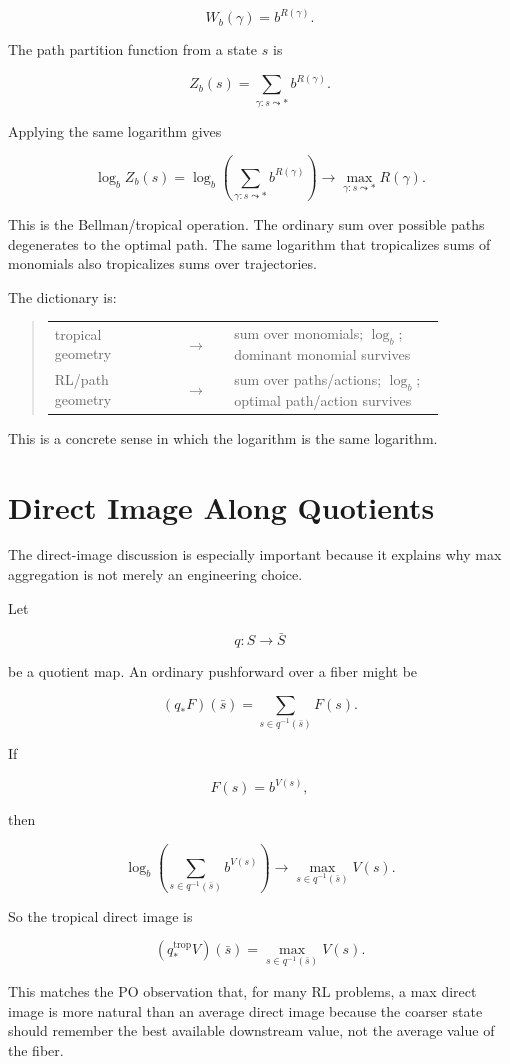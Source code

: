 \documentclass[11pt]{article}
\makeatletter
\newenvironment{dictionary}
  {\begin{quote}\begin{tabular}{@{}p{0.30\linewidth}c p{0.54\linewidth}@{}}}
  {\end{tabular}\end{quote}}
\makeatother
\begin{document}
\[
W_b(\gamma)
=
b^{R(\gamma)}.
\]

The path partition function from a state \(s\) is

\[
Z_b(s)
=
\sum_{\gamma:s\leadsto *} b^{R(\gamma)}.
\]

Applying the same logarithm gives

\[
\log_b Z_b(s)
=
\log_b
\left(
\sum_{\gamma:s\leadsto *} b^{R(\gamma)}
\right)
\longrightarrow
\max_{\gamma:s\leadsto *} R(\gamma).
\]

This is the Bellman/tropical operation. The ordinary sum over possible paths
degenerates to the optimal path. The same logarithm that tropicalizes sums of
monomials also tropicalizes sums over trajectories.

The dictionary is:

\begin{dictionary}
tropical geometry
  & \(\longrightarrow\) &
sum over monomials; \(\log_b\); dominant monomial survives \\
RL/path geometry
  & \(\longrightarrow\) &
sum over paths/actions; \(\log_b\); optimal path/action survives
\end{dictionary}

This is a concrete sense in which the logarithm is the same logarithm.

\section{Direct Image Along Quotients}

The direct-image discussion is especially important because it explains why max
aggregation is not merely an engineering choice.

Let

\[
q:S\to \bar S
\]

be a quotient map. An ordinary pushforward over a fiber might be

\[
(q_*F)(\bar s)
=
\sum_{s\in q^{-1}(\bar s)} F(s).
\]

If

\[
F(s)=b^{V(s)},
\]

then

\[
\log_b
\left(
\sum_{s\in q^{-1}(\bar s)} b^{V(s)}
\right)
\longrightarrow
\max_{s\in q^{-1}(\bar s)} V(s).
\]

So the tropical direct image is

\[
(q_*^{\mathrm{trop}}V)(\bar s)
=
\max_{s\in q^{-1}(\bar s)} V(s).
\]

This matches the PO observation that, for many RL problems, a max direct image
is more natural than an average direct image because the coarser state should
remember the best available downstream value, not the average value of the
fiber.
\end{document}
